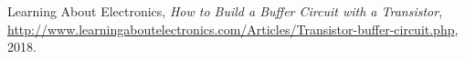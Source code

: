 {}
\begin{thebibliography}{99}
  
    Learning About Electronics,
    \emph{How to Build a Buffer Circuit with a Transistor},
    \url{http://www.learningaboutelectronics.com/Articles/Transistor-buffer-circuit.php},
    2018.

\end{thebibliography}